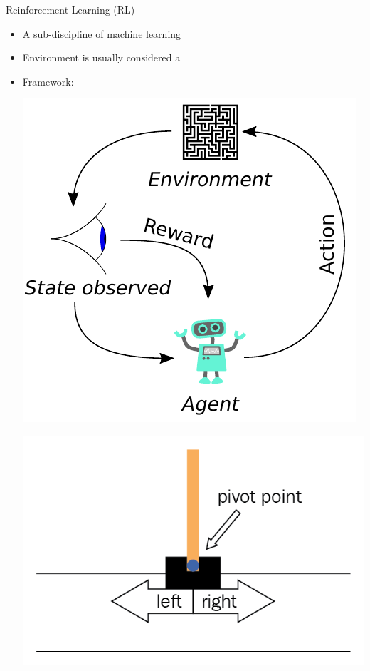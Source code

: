 \documentclass[aspectratio=1610]{beamer}
\begin{document}
\begin{frame}{Reinforcement Learning (RL)}
	\begin{itemize}
		\item A sub-discipline of machine learning
		\item Environment is usually considered a 
		\item Framework:\\
		\begin{minipage}[c]{0.42\textwidth}
			\includegraphics[width=\linewidth]{graphics/reinforcement_learning}
		\end{minipage} \hfill
		\begin{minipage}[c]{0.19\textwidth}
			\includegraphics[width=\linewidth]{graphics/cartpole.png}\\[1cm]

\end{minipage}
\end{itemize}
\end{frame}
\end{document}
